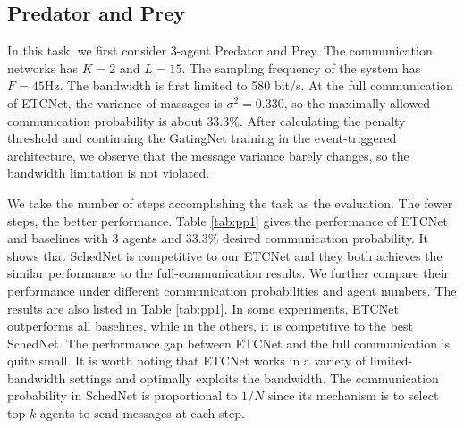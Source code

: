 \documentclass[letterpaper]{article} %
\begin{document}
\subsection{Predator and Prey}\label{sec:pp}

In this task, we first consider 3-agent Predator and Prey. The communication networks has $K=2$ and $L=15$. The sampling frequency of the system has $F=45$Hz. The bandwidth is first limited to 580 bit/s. At the full communication of ETCNet, the variance of massages is $\sigma^2=0.330$, so the maximally allowed communication probability is about $33.3\%$. After calculating the penalty threshold and continuing the GatingNet training in the event-triggered architecture, we observe that the message variance barely changes, so the bandwidth limitation is not violated.

We take the number of steps accomplishing the task as the evaluation. The fewer steps, the better performance. Table \ref{tab:pp1} gives the performance of ETCNet and baselines with 3 agents and $33.3\%$ desired communication probability. It shows that SchedNet is competitive to our ETCNet and they both achieves the similar performance to the full-communication results.
We further compare their performance under different communication probabilities and agent numbers. The results are also listed in Table \ref{tab:pp1}. In some experiments, ETCNet outperforms all baselines, while in the others, it is competitive to the best SchedNet. The performance gap between ETCNet and the full communication is quite small. It is worth noting that ETCNet works in a variety of limited-bandwidth settings and optimally exploits the bandwidth. The communication probability in SchedNet is proportional to
$1/N$ since its mechanism is to select top-$k$ agents to send messages at each step.
\end{document}
